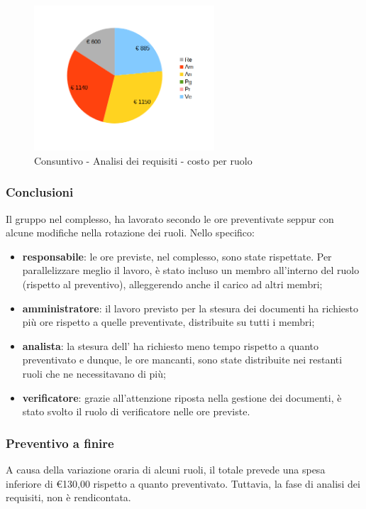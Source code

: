 \begin{figure} [h!]
	\centering
	\includegraphics[width=0.6\textwidth]{res/img/grafici/consuntivo- torta_ costo_per_ora- analisi dei requisiti.png}
	\caption{Consuntivo - Analisi dei requisiti - costo per ruolo} 
\end{figure}

\newpage 

\subsubsection{Conclusioni}
Il gruppo nel complesso, ha lavorato secondo le ore preventivate seppur con alcune modifiche nella rotazione dei ruoli.
Nello specifico:
\begin{itemize}
	\item {\bfseries responsabile}: le ore previste, nel complesso, sono state rispettate. Per parallelizzare meglio il lavoro, è stato incluso un membro all'interno del ruolo (rispetto al preventivo), alleggerendo anche il carico ad altri membri;
	\item {\bfseries amministratore}: il lavoro previsto per la stesura dei documenti ha richiesto più ore rispetto a quelle preventivate, distribuite su tutti i membri;
	\item {\bfseries analista}: la stesura dell' ha richiesto meno tempo rispetto a quanto preventivato e dunque, le ore mancanti, sono state distribuite nei restanti ruoli che ne necessitavano di più;
	\item {\bfseries verificatore}: grazie all'attenzione riposta nella gestione dei documenti, è stato svolto il ruolo di verificatore nelle ore previste.\\
	
\end{itemize}



	\subsubsection{Preventivo a finire}
	A causa della variazione oraria di alcuni ruoli, il totale prevede una spesa inferiore di \euro 130,00 rispetto a quanto preventivato.
	Tuttavia, la fase di analisi dei requisiti, non è rendicontata.

